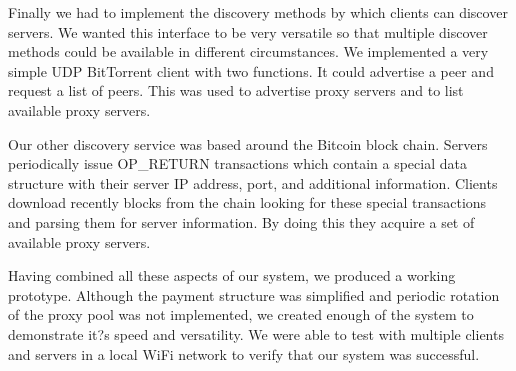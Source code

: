 Finally we had to implement the discovery methods by which clients can discover servers. We wanted this interface to be very versatile so that multiple discover methods could be available in different circumstances. We implemented a very simple UDP BitTorrent client with two functions. It could advertise a peer and request a list of peers. This was used to advertise proxy servers and to list available proxy servers.
	
Our other discovery service was based around the Bitcoin block chain. Servers periodically issue OP\_RETURN transactions which contain a special data structure with their server IP address, port, and additional information. Clients download recently blocks from the chain looking for these special transactions and parsing them for server information. By doing this they acquire a set of available proxy servers.

Having combined all these aspects of our system, we produced a working prototype. Although the payment structure was simplified and periodic rotation of the proxy pool was not implemented, we created enough of the system to demonstrate it?s speed and versatility. We were able to test with multiple clients and servers in a local WiFi network to verify that our system was successful.